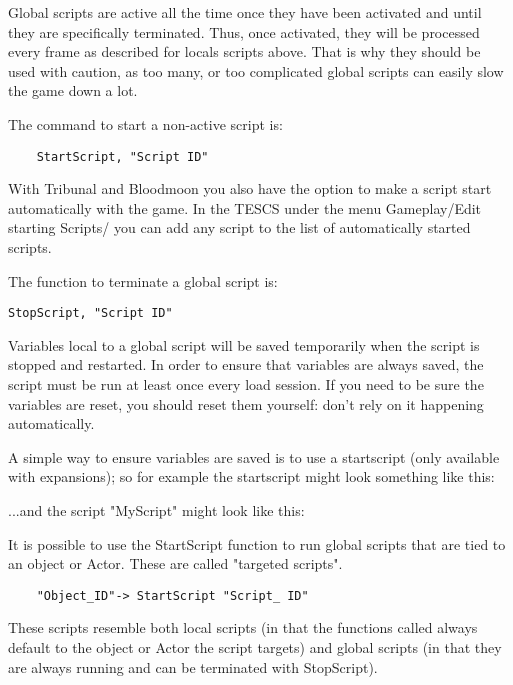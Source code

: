 Global scripts are active all the time once they have been activated and
until they are specifically terminated. Thus, once activated, they will
be processed every frame as described for locals scripts above. That is
why they should be used with caution, as too many, or too complicated
global scripts can easily slow the game down a lot.

The command to start a non-active script is:

\begin{lstlisting}
	StartScript, "Script ID"
\end{lstlisting}

With Tribunal and Bloodmoon you also have the option to make a script
start automatically with the game. In the TESCS under the menu
Gameplay/Edit starting Scripts/ you can add any script to the list of
automatically started scripts.

The function to terminate a global script is:

\begin{lstlisting}
StopScript, "Script ID"
\end{lstlisting}

Variables local to a global script will be saved temporarily when the
script is stopped and restarted. In order to ensure that variables are
always saved, the script must be run at least once every load session.
If you need to be sure the variables are reset, you should reset them
yourself: don't rely on it happening automatically.

A simple way to ensure variables are saved is to use a startscript (only
available with expansions); so for example the startscript might look
something like this:



...and the script "MyScript" might look like this:



It is possible to use the StartScript function to run global scripts
that are tied to an object or Actor. These are called "targeted
scripts".

\begin{lstlisting}
	"Object_ID"-> StartScript "Script_ ID"
\end{lstlisting}

These scripts resemble both local scripts (in that the functions called
always default to the object or Actor the script targets) and global
scripts (in that they are always running and can be terminated with
StopScript).

